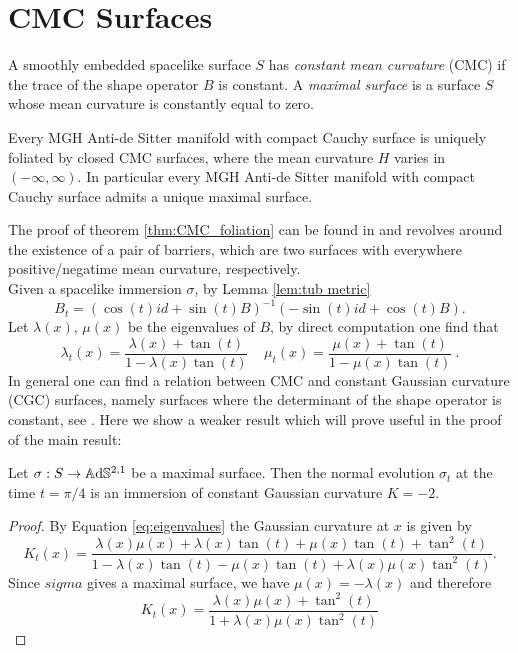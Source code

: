 \section{CMC Surfaces}
A smoothly embedded spacelike surface $S$ has \textit{constant mean curvature} (CMC) if the trace of the shape operator $B$ is constant. A \textit{maximal surface} is a surface $S$ whose mean curvature is constantly equal to zero.
\begin{theorem}\label{thm:CMC_foliation}
    Every MGH Anti-de Sitter manifold with compact Cauchy surface is uniquely foliated by closed CMC surfaces, where the mean curvature $H$ varies in $(-\infty,\infty)$. In particular every MGH Anti-de Sitter manifold with compact Cauchy surface admits a unique maximal surface.
\end{theorem}
The proof of theorem \ref{thm:CMC_foliation} can be found in \cite{barbot2004constant} and revolves around the existence of a pair of barriers, which are two surfaces with everywhere positive/negatime mean curvature, respectively.\\
Given a spacelike immersion $\sigma$, by Lemma \ref{lem:tub metric}
\[
    B_t = (\cos(t) id + \sin(t) B)^{-1}(-\sin(t) id + \cos(t) B).
\]
Let $\lambda(x)$, $\mu(x)$ be the eigenvalues of $B$, by direct computation one find that
\begin{equation} \label{eq:eigenvalues}
    \lambda_t(x) = \frac{\lambda(x)+\tan(t)}{1- \lambda(x)\tan(t)} \ \ \ \ \ \mu_t(x) = \frac{\mu(x)+\tan(t)}{1- \mu(x)\tan(t)} \ .
\end{equation}
In general one can find a relation between CMC and constant Gaussian curvature (CGC) surfaces, namely surfaces where the determinant of the shape operator is constant, see \cite{chen2017constantmeancurvaturefoliation}. Here we show a weaker result which will prove useful in the proof of the main result:
\begin{proposition} \label{prop:cmc to cgc}
    Let $\sigma: S \to\mathbb{A}\mathrm{d}\mathbb{S}^{2,1}$ be a maximal surface. Then the normal evolution $\sigma_{t}$ at the time $t= \pi / 4$ is an immersion of constant Gaussian curvature $K = -2$.
\end{proposition}
\begin{proof}
    By Equation \ref{eq:eigenvalues} the Gaussian curvature at $x$ is given by
    \[
        K_t(x) = \frac{\lambda(x)\mu(x) + \lambda(x)\tan(t) + \mu(x)\tan(t) + \tan^2(t)}{1 - \lambda(x)\tan(t)- \mu(x)\tan(t) + \lambda(x)\mu(x)\tan^2(t)}.
    \]
    Since $sigma$ gives a maximal surface, we have $\mu(x) = -\lambda(x)$ and therefore
    \[
        K_t(x) = \frac{\lambda(x)\mu(x) + \tan^2(t)}{1 + \lambda(x)\mu(x)\tan^2(t)}
    \]
\end{proof}

